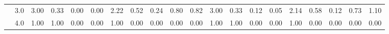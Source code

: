 \begin{tabular}{llrrrrrrrrrrrrrrrrrr}
          & 3.0 &               3.00 &                     0.33 &                                 0.00 &                             0.00 &                           2.22 &                                               0.52 &                                            0.24 &                                            0.80 &                                        0.82 &               3.00 &                     0.33 &                                 0.12 &                             0.05 &                           2.14 &                                               0.58 &                                            0.12 &                                            0.73 &                                        1.10 \\
          & 4.0 &               1.00 &                     1.00 &                                 0.00 &                             0.00 &                           1.00 &                                               0.00 &                                            0.00 &                                            0.00 &                                        0.00 &               1.00 &                     1.00 &                                 0.00 &                             0.00 &                           1.00 &                                               0.00 &                                            0.00 &                                            0.00 &                                        0.00 \\
\bottomrule
\end{tabular}
